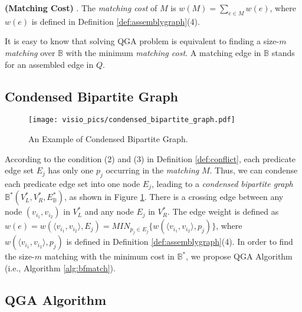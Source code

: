 \begin{definition}\textbf{ (Matching Cost) }. The \emph{matching cost} of $M$ is $w(M) = \sum\nolimits_{e \in M} {w(e)}$, where $w(e)$ is defined in Definition \ref{def:assemblygraph}(4). 
\end{definition}
It is easy to know that solving QGA problem is equivalent to finding a size-$m$ \emph{matching} over $\mathbb{B}$ with the minimum \emph{matching cost}. A matching edge in $\mathbb{B}$ stands for an assembled edge in $Q$.

\subsection{Condensed Bipartite Graph}

\begin{figure} [t]
	\begin{center}
		\texttt{[image: visio\_pics/condensed\_bipartite\_graph.pdf]}
		\caption{An Example of Condensed Bipartite Graph.}
		\label{fig:con_bigraph}
		   \vspace{-0.2in}
	\end{center}
\end{figure}


According to the condition (2) and (3) in Definition \ref{def:conflict}, each predicate edge set $E_j$ has only one $p_j$ occurring in the \emph{matching} $M$. Thus, we can condense each predicate edge set into one node $E_j$, leading to a \emph{condensed bipartite graph} $\mathbb{B}^{*}(V_{L}^*,V_{R}^*,E_{\mathbb{B}}^*)$, as shown in Figure \ref{fig:con_bigraph}. There is a crossing edge between any node $(v_{i_1},v_{i_2})$ in $V_{L}^*$ and any node $E_j$ in $V_{R}^*$. The edge weight is defined as $w(e) = w(\langle v_{i_1} ,v_{i_2}\rangle ,E_j ) = MIN_{p_j  \in E_j } \{ w(\langle v_{i_1} ,v_{i_2}\rangle,p_j)\}$, where $w(\langle v_{i_1 } ,v_{i_2}\rangle,p_j)$ is defined in Definition \ref{def:assemblygraph}(4). In order to find the size-$m$ matching with the minimum cost in $\mathbb{B}^{*}$, we propose QGA Algorithm (i.e., Algorithm \ref{alg:bfmatch}). 


\subsection{QGA Algorithm}

